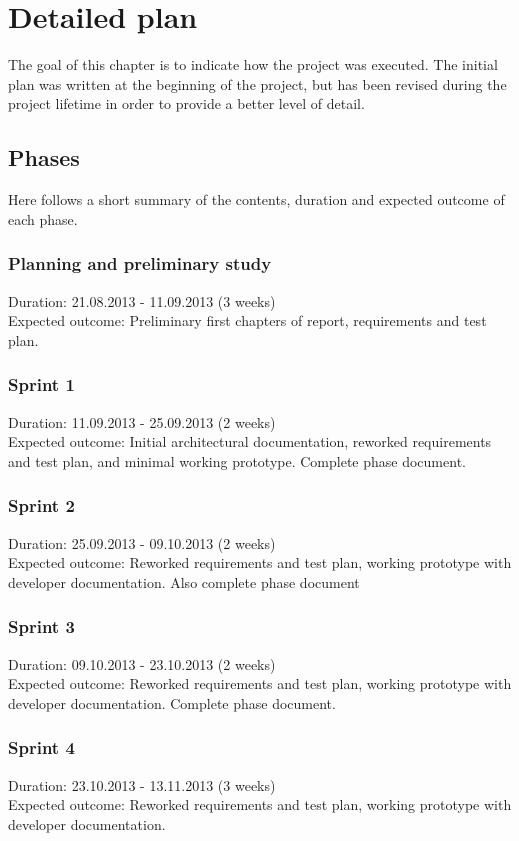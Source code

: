 \documentclass[11pt]{book}
\begin{document}
\section{Detailed plan}
The goal of this chapter is to indicate how the project was executed. The initial plan was written at the beginning of the project, but has been revised during the project lifetime in order to provide a better level of detail.

\subsection{Phases}\label{subsec:phases}
Here follows a short summary of the contents, duration and expected outcome of each phase.

\subsubsection{Planning and preliminary study}
Duration: 21.08.2013 - 11.09.2013 (3 weeks)\\
Expected outcome: Preliminary first chapters of report, requirements and test plan.

\subsubsection{Sprint 1}
Duration: 11.09.2013 - 25.09.2013 (2 weeks)\\
Expected outcome: Initial architectural documentation, reworked requirements and test plan, and minimal working prototype. Complete phase document.

\subsubsection{Sprint 2}
Duration: 25.09.2013 - 09.10.2013 (2 weeks)\\
Expected outcome: Reworked requirements and test plan, working prototype with developer documentation. Also complete phase document

\subsubsection{Sprint 3}
Duration: 09.10.2013 - 23.10.2013 (2 weeks)\\
Expected outcome: Reworked requirements and test plan, working prototype with developer documentation. Complete phase document.

\subsubsection{Sprint 4}
Duration: 23.10.2013 - 13.11.2013 (3 weeks)\\
Expected outcome: Reworked requirements and test plan, working prototype with developer documentation.
\end{document}
